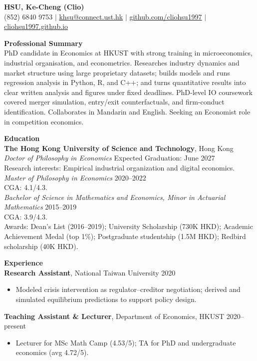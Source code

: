 \documentclass[11pt,letterpaper]{article}
\begin{document}
{\Large \textbf{HSU, Ke-Cheng (Clio)}}\\[1pt]
(852) 6840 9753 \quad $|$ \quad \href{mailto:khsu@connect.ust.hk}{khsu@connect.ust.hk} \quad $|$ \quad \href{https://github.com/cliohsu1997}{github.com/cliohsu1997} \quad $|$ \quad \href{https://cliohsu1997.github.io/}{cliohsu1997.github.io}

\vspace{0.15pt}

{\large \textbf{Professional Summary}}\\[-0.5pt]
PhD candidate in Economics at HKUST with strong training in microeconomics, industrial organisation, and econometrics. Researches industry dynamics and market structure using large proprietary datasets; builds models and runs regression analysis in Python, R, and C++; and turns quantitative results into clear written analysis and figures under fixed deadlines. PhD-level IO coursework covered merger simulation, entry/exit counterfactuals, and firm-conduct identification. Collaborates in Mandarin and English. Seeking an Economist role in competition economics.

\vspace{0.15pt}

{\large \textbf{Education}}\\[-0.5pt]
\textbf{The Hong Kong University of Science and Technology}, Hong Kong\\
\textit{Doctor of Philosophy in Economics} \hfill Expected Graduation: June 2027\\
Research interests: Empirical industrial organization and digital economics.\\
\textit{Master of Philosophy in Economics} \hfill 2020--2022\\
CGA: 4.1/4.3.\\
\textit{Bachelor of Science in Mathematics and Economics, Minor in Actuarial Mathematics} \hfill 2015--2019\\
CGA: 3.9/4.3.\\
Awards: Dean's List (2016--2019); University Scholarship (730K HKD); Academic Achievement Medal (top 1\%); Postgraduate studentship (1.5M HKD); Redbird scholarship (40K HKD).

\vspace{0.15pt}

{\large \textbf{Experience}}\\[-0.5pt]
\textbf{Research Assistant}, National Taiwan University \hfill 2020\\
\vspace{-6pt}
\begin{itemize}
  \item Modeled crisis intervention as regulator--creditor negotiation; derived and simulated equilibrium predictions to support policy design.
\end{itemize}
\textbf{Teaching Assistant \& Lecturer}, Department of Economics, HKUST \hfill 2020--present\\
\vspace{-6pt}
\begin{itemize}
  \item Lecturer for MSc Math Camp (4.53/5); TA for PhD and undergraduate economics (avg 4.72/5).
\end{itemize}
\end{document}
